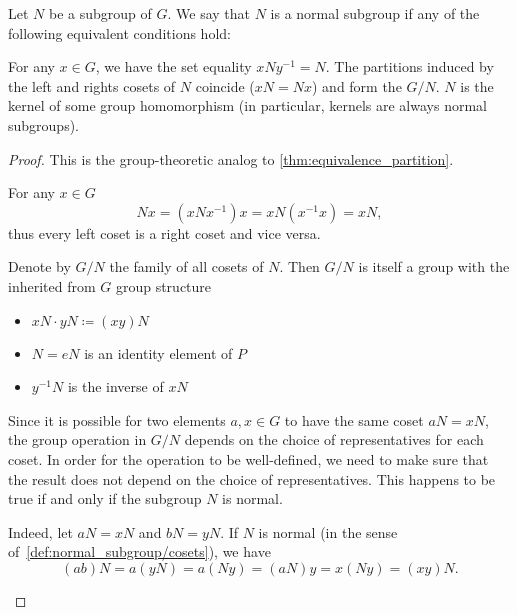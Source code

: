 \begin{definition}\label{def:normal_subgroup}
  Let \( N \) be a subgroup of \( G \). We say that \( N \) is a normal subgroup if any of the following equivalent conditions hold:
  \begin{defenum}
     For any \( x \in G \), we have the set equality \( x N y^{-1} = N \).
     The partitions induced by the left and rights cosets of \( N \) coincide (\( xN = Nx \)) and form the  \( G / N \).
     \( N \) is the kernel of some group homomorphism (in particular, kernels are always normal subgroups).
  \end{defenum}
\end{definition}
\begin{proof}
  This is the group-theoretic analog to \cref{thm:equivalence_partition}.

  \begin{description}
     For any \( x \in G \)
    \begin{equation*}
      Nx = (xNx^{-1})x = xN(x^{-1}x) = xN,
    \end{equation*}
    thus every left coset is a right coset and vice versa.

     Denote by \( G / N \) the family of all cosets of \( N \). Then \( G / N \) is itself a group with the inherited from \( G \) group structure
    \begin{itemize}
      \item \( xN \cdot yN \coloneqq (xy)N \)
      \item \( N = eN \) is an identity element of \( P \)
      \item \( y^{-1} N \) is the inverse of \( xN \)
    \end{itemize}

    Since it is possible for two elements \( a, x \in G \) to have the same coset \( aN = xN \), the group operation in \( G / N \) depends on the choice of representatives for each coset. In order for the operation to be well-defined, we need to make sure that the result does not depend on the choice of representatives. This happens to be true if and only if the subgroup \( N \) is normal.

    Indeed, let \( aN = xN \) and \( bN = yN \). If \( N \) is normal (in the sense of~\ref{def:normal_subgroup/cosets}), we have
    \begin{equation*}
      (ab)N = a(yN) = a(Ny) = (aN)y = x(Ny) = (xy)N.
    \end{equation*}


\end{description}
\end{proof}
